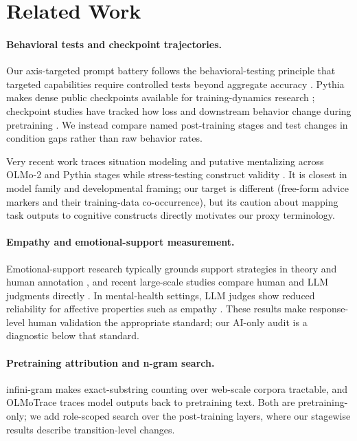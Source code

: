 \documentclass[11pt]{article}
\begin{document}
\section{Related Work}

\paragraph{Behavioral tests and checkpoint trajectories.}
Our axis-targeted prompt battery follows the behavioral-testing principle that
targeted capabilities require controlled tests beyond aggregate accuracy
\citep{ribeiro2020checklist}. Pythia makes dense public checkpoints available
for training-dynamics research \citep{biderman2023pythia}; checkpoint studies
have tracked how loss and downstream behavior change during pretraining
\citep{xia2023trajectories}. We instead compare named post-training stages and
test changes in condition gaps rather than raw behavior rates.

Very recent work traces situation modeling and putative mentalizing across
OLMo-2 and Pythia stages while stress-testing construct validity
\citep{riviere2026developmental}. It is closest in model family and
developmental framing; our target is different (free-form advice markers and
their training-data co-occurrence), but its caution about mapping task outputs
to cognitive constructs directly motivates our proxy terminology.

\paragraph{Empathy and emotional-support measurement.}
Emotional-support research typically grounds support strategies in theory and
human annotation \citep{liu2021emotional}, and recent large-scale studies compare
human and LLM judgments directly \citep{welivita2026empathetic}. In mental-health
settings, LLM judges show reduced reliability for affective properties such as
empathy \citep{badawi2026trust}. These results make response-level human
validation the appropriate standard; our AI-only audit is a diagnostic below
that standard.

\paragraph{Pretraining attribution and n-gram search.}
infini-gram \citep{liu2024infinigram} makes exact-substring counting over
web-scale corpora tractable, and OLMoTrace \citep{liu2025olmotrace} traces
model outputs back to pretraining text. Both are pretraining-only; we add
role-scoped search over the post-training layers, where our stagewise results
describe transition-level changes.
\end{document}
